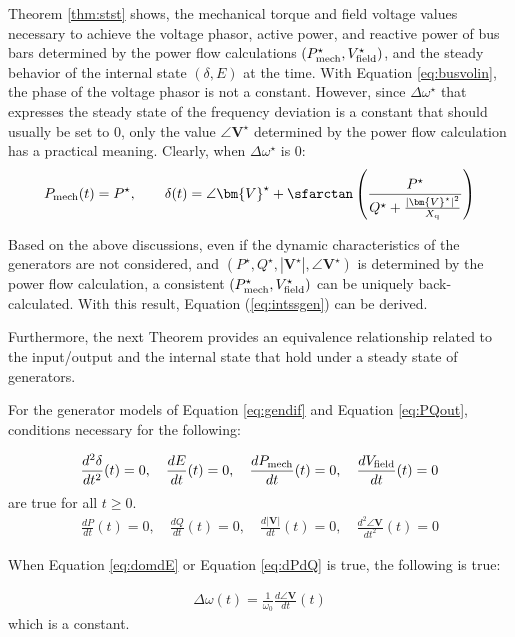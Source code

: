 \documentclass[tombow,dvipdfmx]{corona-a5-1.1}
\begin{document}
Theorem \ref{thm:stst} shows, the mechanical torque and field voltage values necessary to achieve the voltage phasor, active power, and reactive power of bus bars determined by the power flow calculations $(P_{\rm mech}^{\star},V_{\rm field}^{\star})$, and the steady behavior of the internal state $(\delta,E)$ at the time.
With Equation \ref{eq:busvolin}, the phase of the voltage phasor is not a constant. However, since $\Delta \omega^{\star}$ that expresses the steady state of the frequency deviation is a constant that should usually be set to 0, only the value $\angle \bm{V}^{\star}$ determined by the power flow calculation has a practical meaning.
Clearly, when $\Delta \omega^{\star}$ is 0:
\begin{align*}
P_{{\rm mech}}(t) =    P^{\star},\qquad
\delta (t)  = \angle \bm{V}^{\star}
+ \sfarctan \left( \frac{P^{\star}}{Q^{\star} + \tfrac{ |\bm{V}^{\star}|^2}{X_{\rm q}} } \right)
\end{align*}

Based on the above discussions, even if the dynamic characteristics of the generators are not considered, and $(P^{\star},Q^{\star},|\bm{V}^{\star}|,\angle \bm{V}^{\star})$ is determined by the power flow calculation, a consistent $(P_{\rm mech}^{\star},V_{\rm field}^{\star})$ can be uniquely back-calculated.
With this result, Equation (\ref{eq:intssgen}) can be derived.

Furthermore, the next Theorem provides an equivalence relationship related to the input/output and the internal state that hold under a steady state of generators. 

\begin{定理}
\label{thm:outst}

For the generator models of Equation \ref{eq:gendif} and Equation \ref{eq:PQout}, conditions necessary for the following:

\begin{align}\label{eq:domdE}
\frac{d^2 \delta}{dt^2}(t)=0
,\quad
\frac{dE}{dt}(t)=0
,\quad
\frac{d P_{\rm mech}}{dt}(t)=0
,\quad
\frac{d V_{\rm field}}{dt}(t)=0
\end{align}
are true for all $t\geq0$.
\begin{align}\label{eq:dPdQ}
\frac{dP}{dt}(t)=0
,\quad
\frac{dQ}{dt}(t)=0
,\quad
\frac{d|\bm{V}|}{dt}(t)=0
,\quad
\frac{d^2 \angle \bm{V}}{dt^2}(t)=0
\end{align}

When Equation \ref{eq:domdE} or Equation \ref{eq:dPdQ} is true, the following is true:

\begin{align}\label{eq:frer}
\Delta \omega(t)= \frac{1}{\omega_0}\frac{d \angle \bm{V}}{dt}(t)
\end{align}
which is a constant.
\end{定理}
\end{document}
